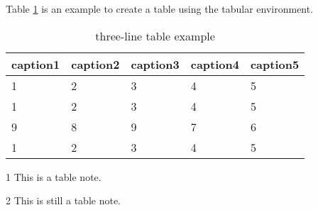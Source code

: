 \documentclass{article}
\begin{document}
Table \ref{tab:tabular1} is an example to create a table using the tabular environment.

\begin{table}[htbp]
    \caption{three-line table example}
    \label{tab:tabular1}
    \centering
    \begin{threeparttable}
        \begin{tabular}{lllll}
            \toprule
            caption1\tnote{1} & caption2 & caption3\tnote{2} & caption4 & caption5 \\
            \midrule
            1                 & 2        & 3                 & 4        & 5        \\
            1                 & 2        & 3                 & 4        & 5        \\
            9                 & 8        & 9                 & 7        & 6        \\
            1                 & 2        & 3                 & 4        & 5        \\
            \bottomrule
        \end{tabular}
        \begin{tablenotes}
            \footnotesize
            \item[1] This is a table note.
            \item[2] This is still a table note.
        \end{tablenotes}

    \end{threeparttable}
\end{table}
\end{document}
